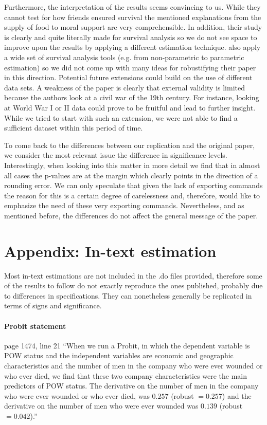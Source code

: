 \documentclass[a4paper]{report}\usepackage{graphicx, color}
\begin{document}
\begin{refsection}
Furthermore, the interpretation of the results seems convincing to us. While they cannot test for how friends ensured survival the mentioned explanations from the supply of food to moral support are very comprehensible. In addition, their study is clearly and quite literally made for survival analysis so we do not see space to improve upon the results by applying a different estimation technique. \textcite{costa2007surviving} also apply a wide set of survival analysis tools (e.g. from non-parametric to parametric estimation) so we did not come up with many ideas for robustifying their paper in this direction. Potential future extensions could build on the use of different data sets. A weakness of the paper is clearly that external validity is limited because the authors look at a civil war of the 19th century. For instance, looking at World War I or II data could prove to be fruitful and lead to further insight. While we tried to start with such an extension, we were not able to find a sufficient dataset within this period of time.

To come back to the differences between our replication and the original paper, we consider the most relevant issue the difference in significance levels. Interestingly, when looking into this matter in more detail we find that in almost all cases the p-values are at the margin which clearly points in the direction of a rounding error. We can only speculate that given the lack of exporting commands the reason for this is a certain degree of carelessness and, therefore, would like to emphasize the need of these very exporting commands. Nevertheless, and as mentioned before, the differences do not affect the general message of the paper.


\section*{Appendix: In-text estimation}
Most in-text estimations are not included in the .do files provided, therefore some of the results to follow do not exactly reproduce the ones published, probably due to differences in specifications. They can nonetheless generally be replicated in terms of signs and significance.

\paragraph{Probit statement}
page 1474, line 21 ``When we run a Probit, in which the dependent variable is POW status and the independent variables are economic and geographic characteristics and the number of men in the company who were ever wounded or who ever died, we find that these two company characteristics were the main predictors of POW status. The derivative on the number of men in the company who were ever wounded or who ever died, was $0.257$ (robust $= 0.257$) and the derivative on the number of men who were ever wounded was $0.139$ (robust $= 0.042$).''


\end{refsection}
\end{document}
